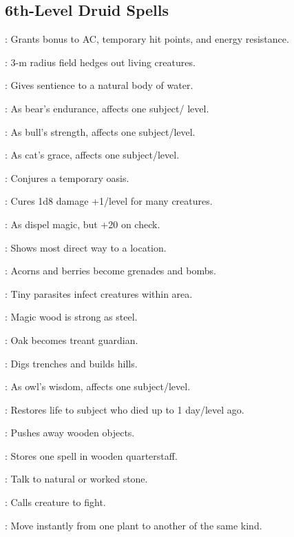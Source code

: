 \subsection{6th-Level Druid Spells}

: Grants bonus to AC, temporary hit points, and energy resistance.

: 3-m radius field hedges out living creatures.

: Gives sentience to a natural body of water.

: As bear's endurance, affects one subject/ level.

: As bull's strength, affects one subject/level.

: As cat's grace, affects one subject/level.

: Conjures a temporary oasis.

: Cures 1d8 damage +1/level for many creatures.

: As dispel magic, but +20 on check.

: Shows most direct way to a location.

: Acorns and berries become grenades and bombs.

: Tiny parasites infect creatures within area.

: Magic wood is strong as steel.

: Oak becomes treant guardian.

: Digs trenches and builds hills.

: As owl's wisdom, affects one subject/level.

: Restores life to subject who died up to 1 day/level ago.

: Pushes away wooden objects.

: Stores one spell in wooden quarterstaff.

: Talk to natural or worked stone.

: Calls creature to fight.

: Move instantly from one plant to another of the same kind.

